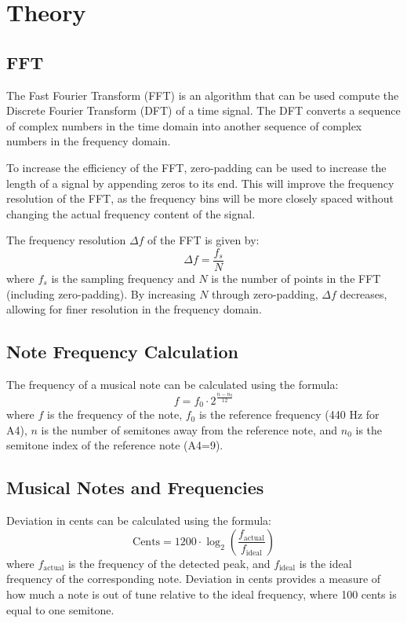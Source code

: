 \chapter{Theory}


\section{FFT} 

The Fast Fourier Transform (FFT) is an algorithm that can be used compute the Discrete Fourier Transform (DFT) of a time signal. The DFT converts a sequence of complex numbers in the time domain into another sequence of complex numbers in the frequency domain. 

To increase the efficiency of the FFT, zero-padding can be used to increase the length of a signal by appending zeros to its end. This will improve the frequency resolution of the FFT, as the frequency bins will be more closely spaced without changing the actual frequency content of the signal. 

The frequency resolution \( \Delta f \) of the FFT is given by:
\begin{equation}
\Delta f = \frac{f_s}{N}
\label{eq:freq_resolution}
\end{equation}
where \( f_s \) is the sampling frequency and \( N \) is the number of points in the FFT (including zero-padding). By increasing \( N \) through zero-padding, \( \Delta f \) decreases, allowing for finer resolution in the frequency domain. 


\section{Note Frequency Calculation}

The frequency of a musical note can be calculated using the formula:
\begin{equation}
f = f_0 \cdot 2^{\frac{n - n_0}{12}}
\label{eq:note_freq}
\end{equation}
where \( f \) is the frequency of the note, \( f_0 \) is the reference frequency (440 Hz for A4), \( n \) is the number of semitones away from the reference note, and \( n_0 \) is the semitone index of the reference note (A4=9).


\section{Musical Notes and Frequencies}

Deviation in cents can be calculated using the formula:
\begin{equation}
\text{Cents} = 1200 \cdot \log_2\left(\frac{f_{\text{actual}}}{f_{\text{ideal}}}\right)
\label{eq:deviation_cents}
\end{equation}
where \( f_{\text{actual}} \) is the frequency of the detected peak, and \( f_{\text{ideal}} \) is the ideal frequency of the corresponding note. Deviation in cents provides a measure of how much a note is out of tune relative to the ideal frequency, where 100 cents is equal to one semitone.

